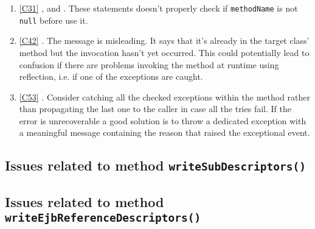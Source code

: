 \begin{enumerate}
	\item \ref{C31} ,  and . These statements doesn't properly check if \texttt{methodName} is not \texttt{null} before use it.
	\item \ref{C42} . The message is misleading. It says that it's already in the target class' method but the invocation hasn't yet occurred. This could potentially lead to confusion if there are problems invoking the method at runtime using reflection, i.e. if one of the exceptions are caught.
	\item \ref{C53} . Consider catching all the checked exceptions within the method rather than propagating the last one to the caller in case all the tries fail. If the error is unrecoverable a good solution is to throw a dedicated exception with a meaningful message containing the reason that raised the exceptional event. 
\end{enumerate}

\subsection{Issues related to method \texttt{writeSubDescriptors()}}

\subsection{Issues related to method \texttt{writeEjbReferenceDescriptors()}}